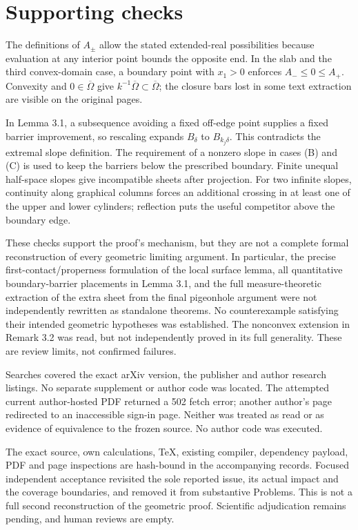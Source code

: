 \documentclass[10pt]{article}
\begin{document}
\section*{Supporting checks}
The definitions of \(A_\pm\) allow the stated extended-real possibilities because evaluation at any interior point bounds the opposite end. In the slab and the third convex-domain case, a boundary point with \(x_1>0\) enforces \(A_-\le0\le A_+\). Convexity and \(0\in\overline\Omega\) give \(k^{-1}\overline\Omega\subset\overline\Omega\); the closure bars lost in some text extraction are visible on the original pages.\par
In Lemma 3.1, a subsequence avoiding a fixed off-edge point supplies a fixed barrier improvement, so rescaling expands \(B_\delta\) to \(B_{k_j\delta}\). This contradicts the extremal slope definition. The requirement of a nonzero slope in cases (B) and (C) is used to keep the barriers below the prescribed boundary. Finite unequal half-space slopes give incompatible sheets after projection. For two infinite slopes, continuity along graphical columns forces an additional crossing in at least one of the upper and lower cylinders; reflection puts the useful competitor above the boundary edge.\par
These checks support the proof’s mechanism, but they are not a complete formal reconstruction of every geometric limiting argument. In particular, the precise first-contact/properness formulation of the local surface lemma, all quantitative boundary-barrier placements in Lemma 3.1, and the full measure-theoretic extraction of the extra sheet from the final pigeonhole argument were not independently rewritten as standalone theorems. No counterexample satisfying their intended geometric hypotheses was established. The nonconvex extension in Remark 3.2 was read, but not independently proved in its full generality. These are review limits, not confirmed failures.\par
Searches covered the exact arXiv version, the publisher and author research listings. No separate supplement or author code was located. The attempted current author-hosted PDF returned a 502 fetch error; another author’s page redirected to an inaccessible sign-in page. Neither was treated as read or as evidence of equivalence to the frozen source. No author code was executed.\par
The exact source, own calculations, TeX, existing compiler, dependency payload, PDF and page inspections are hash-bound in the accompanying records. Focused independent acceptance revisited the sole reported issue, its actual impact and the coverage boundaries, and removed it from substantive Problems. This is not a full second reconstruction of the geometric proof. Scientific adjudication remains pending, and human reviews are empty.\par
\end{document}
